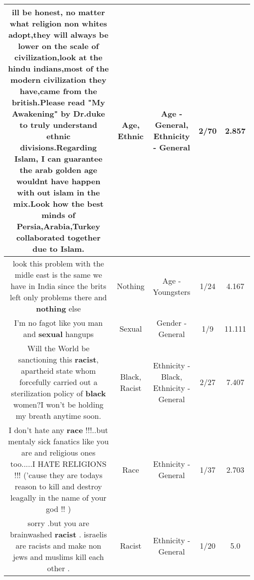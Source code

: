 \documentclass[11pt]{article}
\newlength\mylength
\begin{document}
\begin{center}
\begin{longtable}{|C{.65\mylength}|C{.30\mylength}|C{.12\mylength}|C{.12\mylength}|C{.12\mylength}|}
  \small ill be honest, no matter what religion non whites adopt,they will always be lower on the scale of civilization,look at the hindu indians,most of the modern civilization they have,came from the british.Please read "My Awakening" by Dr.duke to truly understand \textbf{ethnic} divisions.Regarding Islam, I can guarantee the arab golden \textbf{age} wouldnt have happen with out islam in the mix.Look how the best minds of Persia,Arabia,Turkey collaborated together due to Islam.\normalsize   & Age, Ethnic & Age - General, Ethnicity - General & 2/70 & 2.857 \\  \hline
  \small look this problem with the midle east is the same we have in India since the brits left only problems there  and \textbf{nothing} else\normalsize   & Nothing & Age - Youngsters & 1/24 & 4.167 \\  \hline
  \small I'm no fagot like you man and \textbf{sexual} hangups\normalsize   & Sexual & Gender - General & 1/9 & 11.111 \\  \hline
  \small Will the World be sanctioning this \textbf{racist}, apartheid state whom forcefully carried out a sterilization policy of \textbf{black} women?I won't be holding my breath anytime soon.\normalsize   & Black, Racist & Ethnicity - Black, Ethnicity - General & 2/27 & 7.407 \\  \hline
  \small I don't hate any \textbf{race} !!!..but mentaly sick fanatics like you are   and religious ones too.....I HATE RELIGIONS !!!  ('cause they are todays reason to kill and destroy leagally in the name of your god  !! )\normalsize   & Race & Ethnicity - General & 1/37 & 2.703 \\  \hline
  \small sorry .but you are  brainwashed \textbf{racist} . israelis are racists and make non jews and muslims kill each other .\normalsize   & Racist & Ethnicity - General & 1/20 & 5.0 \\  \hline

\end{longtable}
\end{center}
\end{document}
